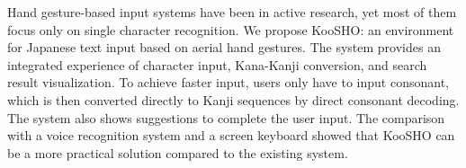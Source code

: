 Hand gesture-based input systems have been in active research, yet most of them focus only on single character recognition. We propose KooSHO: an environment
 for Japanese text input based on aerial hand gestures. The system provides an
 integrated experience of character input, Kana-Kanji conversion, and search
 result visualization. To achieve faster input, users only have to input
 consonant, which is then converted directly to Kanji sequences by direct
 consonant decoding. The system also shows suggestions to complete the user
 input. The comparison with a voice recognition system and a screen keyboard
 showed that KooSHO can be a more practical solution compared to the existing
 system.

